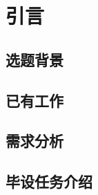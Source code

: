 

\chapter{引言}
\label{cha:intro}

\section{选题背景}
\label{sec:background}

\section{已有工作}
\label{sec:previouswork}

\section{需求分析}
\label{sec:requirements}

\section{毕设任务介绍}
\label{sec:workbrief}
